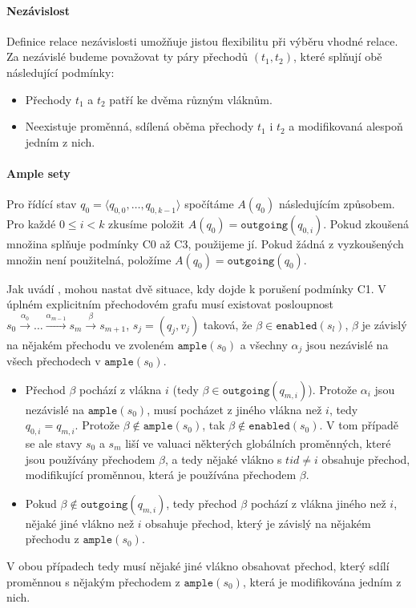 \documentclass[10pt,a4paper,notitlepage]{report}
\newcommand{\tuple}[1]{\langle #1 \rangle}
\begin{document}
\paragraph{Nezávislost}
Definice relace nezávislosti umožňuje jistou flexibilitu při výběru vhodné relace. Za nezávislé budeme považovat ty páry přechodů $(t_1, t_2)$, které splňují obě následující podmínky:
\begin{itemize}
\item Přechody $t_1$ a $t_2$ patří ke dvěma různým vláknům.
\item Neexistuje proměnná, sdílená oběma přechody $t_1$ i $t_2$ a modifikovaná alespoň jedním z nich.
\end{itemize}


\paragraph{Ample sety}
Pro řídící stav $q_0 = \tuple{q_{0,0}, \ldots, q_{0,k-1}}$ spočítáme $A(q_0)$ následujícím způsobem. Pro každé $0 \leq i < k$ zkusíme položit $A(q_0) = \texttt{outgoing}(q_{0,i})$. Pokud zkoušená množina splňuje podmínky C0 až C3, použijeme jí. Pokud žádná z vyzkoušených množin není použitelná, položíme $A(q_0) = \texttt{outgoing}(q_0)$.

Jak uvádí \cite{CLARKE}, mohou nastat dvě situace, kdy dojde k porušení podmínky C1. V úplném explicitním přechodovém grafu musí existovat posloupnost $s_0 \xrightarrow{\alpha_0} \ldots \xrightarrow{\alpha_{m-1}} s_m \xrightarrow{\beta} s_{m+1}$, $s_j = (q_j, v_j)$ taková, že $\beta \in \texttt{enabled}(s_l)$, $\beta$ je závislý na nějakém přechodu ve zvoleném $\texttt{ample}(s_0)$ a všechny $\alpha_j$ jsou nezávislé na všech přechodech v $\texttt{ample}(s_0)$.

\begin{itemize}
\item Přechod $\beta$ pochází z vlákna $i$ (tedy $\beta \in \texttt{outgoing}(q_{m,i})$).  Protože $\alpha_i$ jsou nezávislé na $\texttt{ample}(s_0)$, musí pocházet z jiného vlákna než $i$, tedy $q_{0,i} = q_{m,i}$. Protože $\beta \not \in \texttt{ample}(s_0)$, tak $\beta \not \in \texttt{enabled}(s_0)$. V tom případě se ale stavy $s_0$ a $s_m$ liší ve valuaci některých globálních proměnných, které jsou používány přechodem $\beta$, a tedy nějaké vlákno s $tid \neq i$ obsahuje přechod, modifikující proměnnou, která je používána přechodem $\beta$.

\item Pokud $\beta \not \in \texttt{outgoing}(q_{m,i})$, tedy přechod $\beta$ pochází z vlákna jiného než $i$, nějaké jiné vlákno než $i$ obsahuje přechod, který je závislý na nějakém přechodu z $\texttt{ample}(s_0)$. 
\end{itemize}
V obou případech tedy musí nějaké jiné vlákno obsahovat přechod, který sdílí proměnnou s nějakým přechodem z $\texttt{ample}(s_0)$, která je modifikována jedním z nich.
\end{document}
